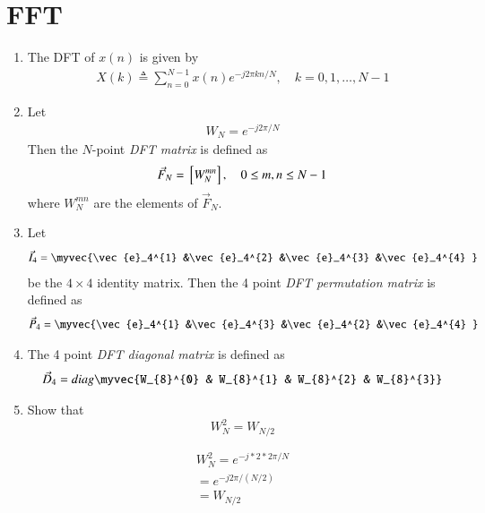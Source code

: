 \documentclass[journal,12pt,twocolumn]{IEEEtran}
\renewcommand\thesection{\arabic{section}}
\begin{document}
\section{FFT}
\begin{enumerate}[label=\arabic*.,ref=\thesection.\theenumi]
    \item The DFT of $x(n)$ is given by
    \begin{align}
        X(k) \triangleq \sum_{n=0}^{N-1} x(n) e^{-j 2 \pi k n / N}, \quad k=0,1, \ldots, N-1
    \end{align}
\item Let 
	\begin{align}
W_{N} = e^{-j2\pi/N} 
	\end{align}
		Then the $N$-point {\em DFT matrix} is defined as 
	\begin{align}
		\vec{F}_{N} = {}\left[W_{N}^{mn}\right], \quad 0 \le m,n \le N-1 
	\end{align}
	where $W_{N}^{mn}$ are the elements of $\vec{F}_{N}$.
\item Let 
	\begin{align}
		\vec{I}_4 = \myvec{\vec{e}_4^{1} &\vec{e}_4^{2} &\vec{e}_4^{3} &\vec{e}_4^{4} }
	\end{align}
		be the $4\times 4$ identity matrix.  Then the 4 point {\em DFT permutation matrix} is defined as 
	\begin{align}
		\vec{P}_4 = \myvec{\vec{e}_4^{1} &\vec{e}_4^{3} &\vec{e}_4^{2} &\vec{e}_4^{4} }
	\end{align}
\item The 4 point {\em DFT diagonal matrix} is defined as 
	\begin{align}
		\vec{D}_4 = diag\myvec{W_{8}^{0} & W_{8}^{1} & W_{8}^{2} & W_{8}^{3}}
	\end{align}
\item Show that 
\begin{equation}
    W_{N}^{2}=W_{N/2}
\end{equation}
\begin{solution}
	\begin{align}
		W_{N}^{2} = {e}^{-j*2*2\pi/N}
		\\
		= {e}^{-j2\pi/(N/2)}
		\\
		= W_{N/2}
	\end{align}
\end{solution}

\end{enumerate}
\end{document}
